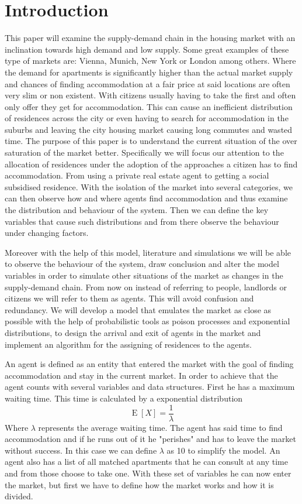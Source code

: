 \chapter{Introduction}
This paper will examine the supply-demand chain in the housing market with an inclination towards high demand and low supply. Some great examples of these type of markets are: Vienna, Munich, New York or London among others. Where the demand for apartments is significantly higher than the actual market supply and chances of finding accommodation at a fair price at said locations are often very slim or non existent. With citizens usually having to take the first and often only offer they get for accommodation. This can cause an inefficient distribution of residences across the city or even having to search for accommodation in the suburbs and leaving the city housing market causing long commutes and wasted time. The purpose of this paper is to understand the current situation of the over saturation of the market better. 
Specifically we will focus our attention to the allocation of residences under the adoption of the approaches a citizen has to find accommodation. From using a private real estate agent to getting a social subsidised residence. With the isolation of the market into several categories, we can then observe how and where agents find accommodation and thus examine the distribution and behaviour of the system. Then we can define the key variables that cause such distributions and from there observe the behaviour under changing factors.

Moreover with the help of this model, literature and simulations we will be able to observe the behaviour of the system, draw conclusion and alter the model variables in order to simulate other situations of the market as changes in the supply-demand chain. From now on instead of referring to people, landlords or citizens we will refer to them as agents. This will avoid confusion and redundancy. We will develop a model that emulates the market as close as possible with the help of probabilistic tools as poison processes and exponential distributions, to design the arrival and exit of agents in the market and implement an algorithm for the assigning of residences to the agents. 

An agent is defined as an entity that entered the market with the goal of finding accommodation and stay in the current market. In order to achieve that the agent counts with several variables and data structures. First he has a maximum waiting time. This time is calculated by a exponential distribution
\begin{equation} \label{eq1}
{\displaystyle \operatorname {E} [X]={\frac {1}{\lambda}}}
\end{equation} 
Where $\lambda$ represents the average waiting time. The agent has said time to find accommodation and if he runs out of it he "perishes" and has to leave the market without success. In this case we can define $\lambda$ as 10 to simplify the model. An agent also has a list of all matched apartments that he can consult at any time and from those choose to take one. With these set of variables he can now enter the market, but first we have to define how the market works and how it is divided.

